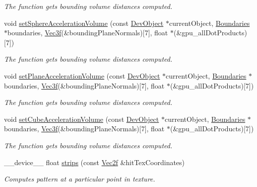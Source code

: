 \begin{DoxyCompactItemize}
\begin{DoxyCompactList}\small\item\em The function gets bounding volume distances computed. \end{DoxyCompactList}\item 
void \hyperlink{group__intersection__test__prperties_gafd2f15ce4a55fb0d8daee0bff024b67b}{set\+Sphere\+Acceleration\+Volume} (const \hyperlink{class_dev_object}{Dev\+Object} $\ast$current\+Object, \hyperlink{class_boundaries}{Boundaries} $\ast$boundaries, \hyperlink{class_vec3}{Vec3f}(\&bounding\+Plane\+Normals)\mbox{[}7\mbox{]}, float $\ast$(\&gpu\+\_\+all\+Dot\+Products)\mbox{[}7\mbox{]})
\begin{DoxyCompactList}\small\item\em The function gets bounding volume distances computed. \end{DoxyCompactList}\item 
void \hyperlink{group__intersection__test__prperties_ga684f41eb2add27e32a7c0115cdd6cce1}{set\+Plane\+Acceleration\+Volume} (const \hyperlink{class_dev_object}{Dev\+Object} $\ast$current\+Object, \hyperlink{class_boundaries}{Boundaries} $\ast$boundaries, \hyperlink{class_vec3}{Vec3f}(\&bounding\+Plane\+Normals)\mbox{[}7\mbox{]}, float $\ast$(\&gpu\+\_\+all\+Dot\+Products)\mbox{[}7\mbox{]})
\begin{DoxyCompactList}\small\item\em The function gets bounding volume distances computed. \end{DoxyCompactList}\item 
void \hyperlink{group__intersection__test__prperties_gabfac85fdf9d0cceb70aefa4c2ed71ad2}{set\+Cube\+Acceleration\+Volume} (const \hyperlink{class_dev_object}{Dev\+Object} $\ast$current\+Object, \hyperlink{class_boundaries}{Boundaries} $\ast$boundaries, \hyperlink{class_vec3}{Vec3f}(\&bounding\+Plane\+Normals)\mbox{[}7\mbox{]}, float $\ast$(\&gpu\+\_\+all\+Dot\+Products)\mbox{[}7\mbox{]})
\begin{DoxyCompactList}\small\item\em The function gets bounding volume distances computed. \end{DoxyCompactList}\item 
\+\_\+\+\_\+device\+\_\+\+\_\+ float \hyperlink{group__intersection__test__prperties_gae0b690ff7b5f9b93e53bb0c1437fbf55}{strips} (const \hyperlink{class_vec2}{Vec2f} \&hit\+Tex\+Coordinates)
\begin{DoxyCompactList}\small\item\em Computes pattern at a particular point in texture. \end{DoxyCompactList}\item 

\end{DoxyCompactItemize}
